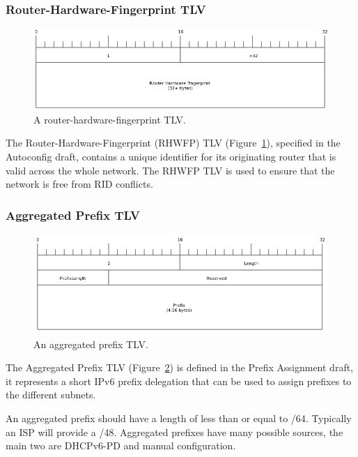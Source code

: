 \subsubsection{Router-Hardware-Fingerprint TLV}
\begin{figure}
\begin{center}
	\includegraphics[width=\linewidth]{../Diagrams/Packets/rhwfp_tlv.png}
	\caption{A router-hardware-fingerprint TLV.}\label{fig:RHWFP-TLV}
\end{center}
\end{figure}
The Router-Hardware-Fingerprint (RHWFP) TLV (Figure~\ref{fig:RHWFP-TLV}),
specified in the Autoconfig draft, contains a unique identifier for its
originating router that is valid across the whole network. The RHWFP TLV is
used to ensure that the network is free from RID conflicts.

\subsubsection{Aggregated Prefix TLV}
\begin{figure}
\begin{center}
	\includegraphics[width=\linewidth]{../Diagrams/Packets/aggregated_prefix_tlv.png}
	\caption{An aggregated prefix TLV.}\label{fig:AggregatedPrefix-TLV}
\end{center}
\end{figure}
The Aggregated Prefix TLV (Figure~\ref{fig:AggregatedPrefix-TLV}) is defined in
the Prefix Assignment draft, it represents a short IPv6 prefix delegation that
can be used to assign prefixes to the different subnets. 

An aggregated prefix should have a length of less than or equal to /64.
Typically an ISP will provide a /48. Aggregated prefixes have many possible
sources, the main two are DHCPv6-PD and manual configuration. 

